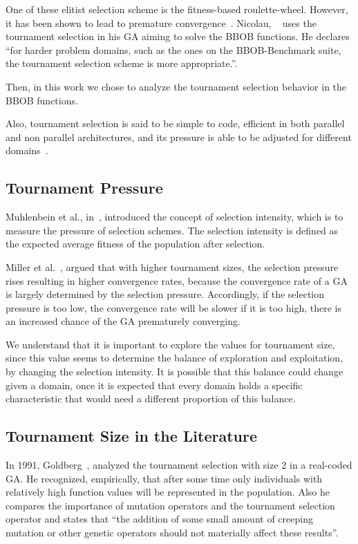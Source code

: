 One of these elitist selection scheme is the fitness-based roulette-wheel. However, it has been shown to lead to premature convergence~\cite{baker1987reducing}. Nicolau, ~\cite{nicolau2009application} uses the tournament selection in his GA aiming to solve the BBOB functions. He declares ``for harder problem domains, such as the ones on the BBOB-Benchmark suite, the tournament selection scheme is more appropriate.''.

Then, in this work we chose to analyze the tournament selection behavior in the BBOB functions.


Also, tournament selection is said to be simple to code, efficient in both parallel and non parallel architectures, and its pressure is able to be adjusted for different domains~\cite{miller1995genetic}.



\subsection{Tournament Pressure}\label{sec:background:tournament_pressure} 
Muhlenbein et al., in~\cite{muhlenbein1993predictive}, introduced the concept of selection intensity, which is to measure the pressure of selection schemes. The selection intensity is defined as the expected average fitness of the population after selection.  

Miller et al.~\cite{miller1995genetic}, argued that with higher tournament sizes, the selection pressure rises resulting in higher convergence rates, because the convergence rate of a GA is largely determined by the selection pressure.  Accordingly, if the selection pressure is too low, the convergence rate will be slower if it is too high, there is an increased chance of the GA prematurely converging. 

We understand that it is important to explore the values for tournament size, since this value seems to determine the balance of exploration and exploitation, by changing the selection intensity. It is possible that this balance could change given a domain, once it is expected that every domain holds a specific characteristic that would need a different proportion of this balance.

\subsection{Tournament Size in the Literature}\label{sec:background:tournament_size} 

In 1991, Goldberg~\cite{goldberg1991real}, analyzed the tournament selection with size 2 in a real-coded GA. He recognized, empirically, that after some time only individuals with relatively high function values will be represented in the population. Also he compares the importance of mutation operators and the tournament selection operator and states that ``the addition of some small amount of creeping mutation or other genetic operators should not materially affect these results''.



